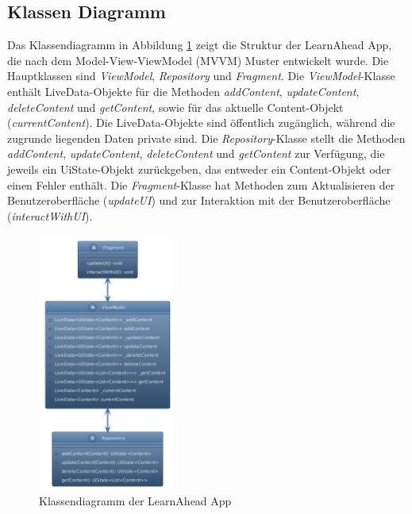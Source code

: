 \subsection{Klassen Diagramm} \label{Klassen Diagramm}
Das Klassendiagramm in Abbildung \ref{fig:klassendiagramm} zeigt die Struktur der LearnAhead App, die nach dem Model-View-ViewModel (MVVM) Muster entwickelt wurde. \newline
Die Hauptklassen sind \textit{ViewModel}, \textit{Repository} und \textit{Fragment}. \newline
Die \textit{ViewModel}-Klasse enthält LiveData-Objekte für die Methoden \textit{addContent}, \textit{updateContent}, \textit{deleteContent} und \textit{getContent}, sowie für das aktuelle Content-Objekt (\textit{currentContent}). Die LiveData-Objekte sind öffentlich zugänglich, während die zugrunde liegenden Daten private sind.\newline
Die \textit{Repository}-Klasse stellt die Methoden \textit{addContent}, \textit{updateContent}, \textit{deleteContent} und \textit{getContent} zur Verfügung, die jeweils ein UiState-Objekt zurückgeben, das entweder ein Content-Objekt oder einen Fehler enthält.\newline
Die \textit{Fragment}-Klasse hat Methoden zum Aktualisieren der Benutzeroberfläche (\textit{updateUI}) und zur Interaktion mit der Benutzeroberfläche (\textit{interactWithUI}).\newline
\begin{figure}[h]
\centering
\includegraphics[width=0.4\textwidth]{images/diagramme/Klassendiagramm.png}
\caption{Klassendiagramm der LearnAhead App}
\label{fig:klassendiagramm}
\end{figure} \newpage
